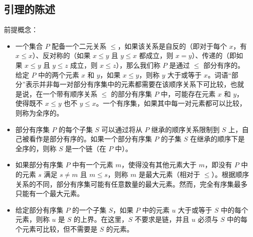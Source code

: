 \subsection{引理的陈述}  
前提概念：
\begin{itemize}
\item 一个集合 \( P \) 配备一个二元关系 \( \leq \)，如果该关系是自反的（即对于每个 \( x \)，有 \( x \leq x \)）、反对称的（如果 \( x \leq y \) 且 \( y \leq x \) 都成立，则 \( x = y \)）、传递的（即如果 \( x \leq y \) 且 \( y \leq z \) 成立，则 \( x \leq z \)），那么我们称 \( P \) 是通过 \( \leq \) 部分有序的。给定 \( P \) 中的两个元素 \( x \) 和 \( y \)，如果 \( x \leq y \)，则称 \( y \) 大于或等于 \( x \)。词语“部分”表示并非每一对部分有序集中的元素都需要在该顺序关系下可比较，也就是说，在一个带有顺序关系 \( \leq \) 的部分有序集 \( P \) 中，可能存在元素 \( x \) 和 \( y \)，使得既不 \( x \leq y \) 也不 \( y \leq x \)。一个有序集，如果其中每一对元素都可以比较，则称为全序的。
\item 部分有序集 \( P \) 的每个子集 \( S \) 可以通过将从 \( P \) 继承的顺序关系限制到 \( S \) 上，自己被看作是部分有序的。如果一个部分有序集 \( P \) 的子集 \( S \) 在继承的顺序下是全序的，则称 \( S \) 是一个链（在 \( P \) 中）。
\item 如果部分有序集 \( P \) 中有一个元素 \( m \)，使得没有其他元素大于 \( m \)，即没有 \( P \) 中的元素 \( s \) 满足 \( s \neq m \) 且 \( m \leq s \)，则称 \( m \) 是最大元素（相对于 \( \leq \)）。根据顺序关系的不同，部分有序集可能有任意数量的最大元素。然而，完全有序集最多只能有一个最大元素。
\item 给定部分有序集 \( P \) 的一个子集 \( S \)，如果 \( P \) 中的元素 \( u \) 大于或等于 \( S \) 中的每个元素，则称 \( u \) 是 \( S \) 的上界。在这里，\( S \) 不要求是链，并且 \( u \) 必须与 \( S \) 中的每个元素可比较，但不需要是 \( S \) 的元素。
\end{itemize}